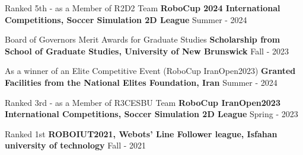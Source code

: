 \begin{cventries}
    
    \cventry
    {Ranked 5th - as a Member of R2D2 Team}
    {\textbf {RoboCup 2024 International Competitions, Soccer Simulation 2D League}}
    {}
    {Summer - 2024}
    {}
    
    
    \cventry
    {Board of Governors Merit Awards for Graduate Studies}
    {\textbf {Scholarship from School of Graduate Studies, University of New Brunswick}}
    {}
    {Fall - 2023}
    {}

    \cventry
    {As a winner of an Elite Competitive Event (RoboCup IranOpen2023)}
    {\textbf {Granted Facilities from the National Elites Foundation, Iran}}
    {}
    {Summer - 2024}
    {}


    \cventry
    {Ranked 3rd - as a Member of R3CESBU Team}
    {\textbf {RoboCup IranOpen2023 International Competitions, Soccer Simulation 2D League}}
    {}
    {Spring - 2023}
    {}

    

    
    \cventry
    {Ranked 1st}
    {\textbf {ROBOIUT2021, Webots’ Line Follower league, Isfahan university of technology}}
    {}
    {Fall - 2021}
    {}




\end{cventries}